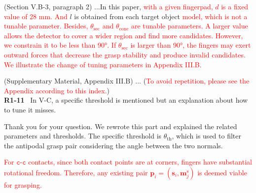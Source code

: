 \documentclass[journal]{IEEEtran}
\newcommand{\rev}[1]{\textcolor{red}{#1}}
\begin{document}
(Section V.B-3, paragraph 2) ...In this paper, \rev{with a given fingerpad, $d$ is a fixed value of 28 mm. And} $l$ is obtained from each target object \rev{model, which is not a tunable parameter. Besides, $\theta_\mathrm{sec}$ and $\theta_\mathrm{cone}$ are tunable parameters. A larger value allows the detector to cover a wider region and find more candidates. However, we constrain it to be less than 90°. If $\theta_\mathrm{sec}$ is larger than 90°, the fingers may exert outward forces that decrease the grasp stability and produce invalid candidates. We illustrate the change of tuning parameters in Appendix III.B.}

(Supplementary Material, Appendix III.B) ... (\rev{To avoid repetition, please see the Appendix according to this index.})\\







\noindent
{\textbf{\color{black}R1-11}\color{gray}~
In V-C, a specific threshold is mentioned but an explanation about how to tune it misses.
}

Thank you for your question. We rewrote this part and explained the related parameters and thresholds. The specific threshold is $\theta_{\text{th}}$, which is used to filter the antipodal grasp pair considering the angle between the two normals. 

\rev{For $\mathtt{c}$-$\mathtt{c}$ contacts, since both contact points are at corners, fingers have substantial rotational freedom. Therefore, any existing pair $\mathbf{p}_i = (\mathbf{s}_i, \mathbf{m}_j^\text{s})$ is deemed viable for grasping.}
\end{document}
